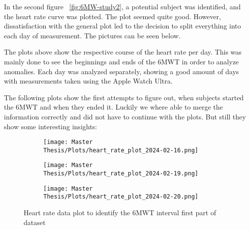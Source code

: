 In the second figure ~\ref{fig:6MW-study2}, a potential subject was identified, and the heart rate curve was plotted. The plot seemed quite good. However, dissatisfaction with the general plot led to the decision to split everything into each day of measurement. The pictures can be seen below.

The plots above show the respective course of the heart rate per day. This was mainly done to see the beginnings and ends of the 6MWT in order to analyze anomalies. Each day was analyzed separately, showing a good amount of days with measurements taken using the Apple Watch Ultra.

The following plots show the first attempts to figure out, when subjects started the 6MWT and when they ended it. Luckily we where able to merge the information correctly and did not have to continue with the plots. But still they show some interesting insights: 

\FloatBarrier
\begin{figure}[h!]
  \centering
  \begin{subfigure}{.55\textwidth}
    \centering
    \texttt{[image: Master Thesis/Plots/heart\_rate\_plot\_2024-02-16.png]}
    \caption{}
    \label{fig:test1}
  \end{subfigure}
  \newline
  \begin{subfigure}{.55\textwidth}
    \centering
    \texttt{[image: Master Thesis/Plots/heart\_rate\_plot\_2024-02-19.png]}
    \caption{}
    \label{fig:test2}
  \end{subfigure}%
  \begin{subfigure}{.55\textwidth}
    \centering
    \texttt{[image: Master Thesis/Plots/heart\_rate\_plot\_2024-02-20.png]}
    \caption{}
    \label{fig:test3}
  \end{subfigure}
  \caption{Heart rate data plot to identify the 6MWT interval first part of dataset}
  \label{fig:allintervall6mwt1}
\end{figure}
\FloatBarrier

